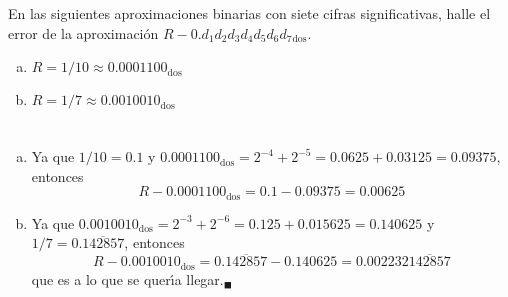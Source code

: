 \begin{enunciado}
 En las siguientes aproximaciones binarias con siete cifras significativas, halle el error de la aproximaci\'on $R - 0.d_1d_2d_3d_4d_5d_6d_7{}_{\text{dos}}$.
 \begin{multicols}{2}
  \begin{enumerate}[(a)]
   \item $R = 1/10 \approx 0.0001100_{\text{dos}}$
   
   \item $R = 1/7 \approx 0.0010010_{\text{dos}}$
  \end{enumerate}
 \end{multicols}
\end{enunciado}

\begin{solucion}
 $\phantom{0}$
 \begin{enumerate}[(a)]
  \item Ya que $1/10 = 0.1$ y $0.0001100_{\text{dos}} = 2^{-4} + 2^{-5} = 0.0625 + 0.03125 = 0.09375$, entonces
  \begin{equation*}
   R - 0.0001100_{\text{dos}} = 0.1 - 0.09375 = 0.00625
  \end{equation*}

  \item Ya que $0.0010010_{\text{dos}} = 2^{-3} + 2^{-6} = 0.125 + 0.015625 = 0.140625$ y $1/7 = 0.\overline{142857}$, entonces
  \begin{equation*}
   R - 0.0010010_{\text{dos}} = 0.\overline{142857} - 0.140625 = 0.002232\overline{142857}
  \end{equation*}
  que es a lo que se quer\'{\i}a llegar.${}_{\blacksquare}$
 \end{enumerate}
\end{solucion}

